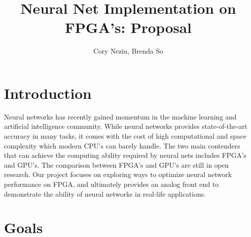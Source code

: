 \documentclass[12pt]{article}
\begin{document}
\title{Neural Net Implementation on FPGA's: Proposal}
\author{Cory Nezin, Brenda So}
\maketitle

\section{Introduction}

Neural networks has recently gained momentum in the machine learning and artificial intelligence community. While neural networks provides state-of-the-art accuracy in many tasks, it comes with the cost of high computational and space complexity which modern CPU's can barely handle. The two main contenders that can achieve the computing ability required by neural nets includes FPGA's and GPU's. The comparison between FPGA's and GPU's are still in open research. Our project focuses on exploring ways to optimize neural network performance on FPGA, and ultimately provides an analog front end to demonstrate the ability of neural networks in real-life applications.

\section{Goals}
\end{document}
